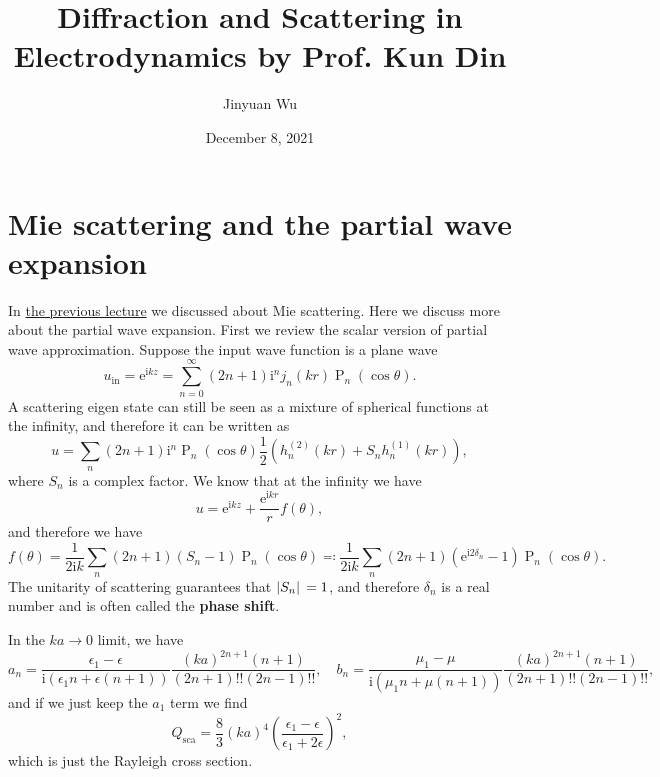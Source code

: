 \documentclass[hyperref, a4paper]{article}
\title{Diffraction and Scattering in Electrodynamics by Prof. Kun Din}
\author{Jinyuan Wu}
\date{December 8, 2021}
\DeclareMathOperator{\legpoly}{P}
\newcommand*{\ii}{\mathrm{i}}
\newcommand*{\ee}{\mathrm{e}}
\newcommand*{\concept}[1]{{\textbf{#1}}}
\begin{document}
\maketitle

\section{Mie scattering and the partial wave expansion}

In \href{lecture-12-1.tex}{the previous lecture} we discussed about Mie scattering. Here we discuss more about 
the partial wave expansion. First we review the scalar version of partial wave approximation.
Suppose the input wave function is a plane wave 
\begin{equation}
    u_\text{in} = \ee^{\ii k z} = \sum_{n=0}^\infty (2n+1) \ii^n j_n(kr ) \legpoly_n(\cos \theta).
\end{equation}
A scattering eigen state can still be seen as a mixture of spherical functions at the infinity, and therefore 
it can be written as 
\begin{equation}
    u = \sum_n (2n+1) \ii^n \legpoly_n(\cos \theta) \frac{1}{2} (h_n^{(2)}(kr) + S_n h_n^{(1)}(kr)),
\end{equation}
where $S_n$ is a complex factor. We know that at the infinity we have 
\begin{equation}
    u = \ee^{\ii k z} + \frac{\ee^{\ii k r}}{r} f(\theta),
\end{equation}
and therefore we have 
\begin{equation}
    f(\theta) = \frac{1}{2 \ii k} \sum_n (2n+1) (S_n - 1) \legpoly_
    n(\cos \theta) \eqqcolon 
    \frac{1}{2 \ii k} \sum_n (2n+1) (\ee^{\ii 2 \delta_n} - 1) \legpoly_n(\cos \theta).
\end{equation}
The unitarity of scattering guarantees that $\abs*{S_n} = 1$, and therefore $\delta_n$ is a real number 
and is often called the \concept{phase shift}.

In the $ka \to 0$ limit, we have 
\begin{equation}
    a_n = \frac{\epsilon_1 - \epsilon}{\ii (\epsilon_1 n + \epsilon (n+1))} \frac{(ka)^{2n+1} (n+1)}{(2n+1)!! (2n-1)!!}, \quad 
    b_n = \frac{\mu_1 - \mu}{\ii (\mu_1 n + \mu (n+1))} \frac{(ka)^{2n+1} (n+1)}{(2n+1)!! (2n-1)!!},
\end{equation}
and if we just keep the $a_1$ term we find 
\begin{equation}
    Q_\text{sca} = \frac{8}{3} (ka)^4 \left(\frac{\epsilon_1 - \epsilon}{\epsilon_1 + 2 \epsilon}\right)^2,
    \label{eq:rayleigh-cross-section}
\end{equation}
which is just the Rayleigh cross section. 
\end{document}
